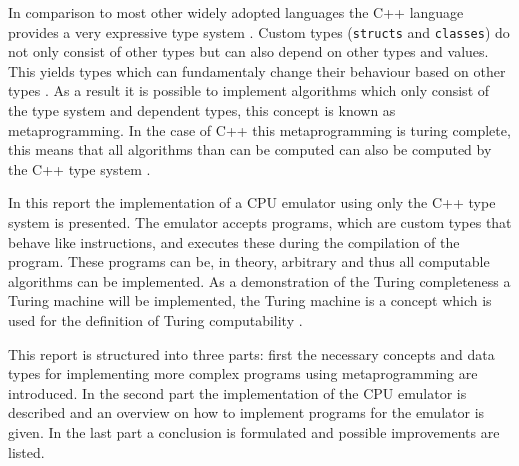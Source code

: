 

In comparison to most other widely adopted languages the C++ language provides a very expressive type system \cite{concepts05}. Custom
types (\lstinline{structs} and \lstinline{classes}) do not only consist of other types but can also depend on other
types and values. This yields types which can fundamentaly change their behaviour based on other types \cite[Chapter~13.3]{std}. As a result
it is possible to implement algorithms which only consist of the type system and dependent types, this concept is known
as metaprogramming. In the case of C++ this metaprogramming is turing complete, this means that all algorithms than
can be computed can also be computed by the C++ type system \cite{TuringComputability}.

In this report the implementation of a CPU emulator using only the C++ type system is presented. The emulator
accepts programs, which are custom types that behave like instructions, and executes these during the compilation of
the program. These programs can be, in theory, arbitrary and thus all computable algorithms can be implemented. As a
demonstration of the Turing completeness a Turing machine will be implemented, the Turing machine is a concept which
is used for the definition of Turing computability \cite{Turing1936}.

This report is structured into three parts: first the necessary concepts and data types for implementing more complex 
programs using metaprogramming are introduced. In the second part the implementation of the CPU emulator is described
and an overview on how to implement programs for the emulator is given. In the last part a conclusion is formulated and
possible improvements are listed.
